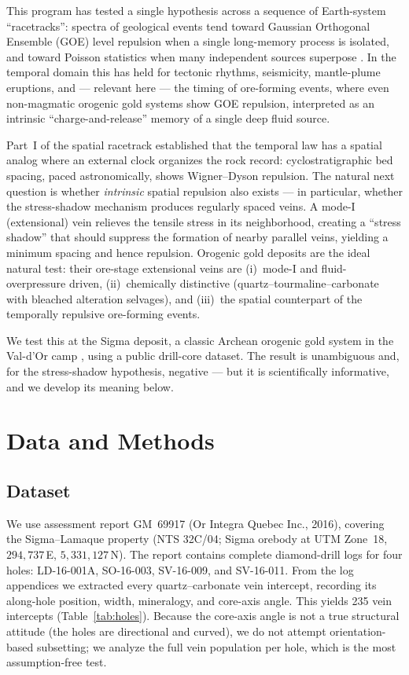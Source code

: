 \documentclass[11pt]{article}
\begin{document}
This program has tested a single hypothesis across a sequence of Earth-system
``racetracks'': spectra of geological events tend toward Gaussian Orthogonal
Ensemble (GOE) level repulsion when a single long-memory process is isolated,
and toward Poisson statistics when many independent sources superpose
\citep{mehta2004}. In the temporal domain this has held for tectonic rhythms,
seismicity, mantle-plume eruptions, and --- relevant here --- the timing of
ore-forming events, where even non-magmatic orogenic gold systems show GOE
repulsion, interpreted as an intrinsic ``charge-and-release'' memory of a single
deep fluid source.

Part~I of the spatial racetrack established that the temporal law has a spatial
analog where an external clock organizes the rock record: cyclostratigraphic
bed spacing, paced astronomically, shows Wigner--Dyson repulsion. The natural
next question is whether \emph{intrinsic} spatial repulsion also exists --- in
particular, whether the stress-shadow mechanism produces regularly spaced veins.
A mode-I (extensional) vein relieves the tensile stress in its neighborhood,
creating a ``stress shadow'' that should suppress the formation of nearby
parallel veins, yielding a minimum spacing and hence repulsion. Orogenic gold
deposits are the ideal natural test: their ore-stage extensional veins are
(i)~mode-I and fluid-overpressure driven, (ii)~chemically distinctive
(quartz--tourmaline--carbonate with bleached alteration selvages), and
(iii)~the spatial counterpart of the temporally repulsive ore-forming events.

We test this at the Sigma deposit, a classic Archean orogenic gold system in the
Val-d'Or camp \citep{robert1983}, using a public drill-core dataset. The result
is unambiguous and, for the stress-shadow hypothesis, negative --- but it is
scientifically informative, and we develop its meaning below.

\section{Data and Methods}

\subsection{Dataset}
We use assessment report GM~69917 (Or Integra Quebec Inc., 2016), covering the
Sigma--Lamaque property (NTS 32C/04; Sigma orebody at UTM Zone~18,
$294{,}737$\,E, $5{,}331{,}127$\,N). The report contains complete diamond-drill
logs for four holes: LD-16-001A, SO-16-003, SV-16-009, and SV-16-011. From the
log appendices we extracted every quartz--carbonate vein intercept, recording
its along-hole position, width, mineralogy, and core-axis angle. This yields
235 vein intercepts (Table~\ref{tab:holes}). Because the core-axis angle is not
a true structural attitude (the holes are directional and curved), we do not
attempt orientation-based subsetting; we analyze the full vein population per
hole, which is the most assumption-free test.
\end{document}
